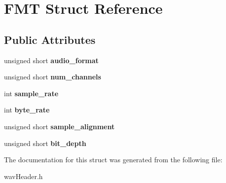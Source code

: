 \hypertarget{structFMT}{}\section{F\+MT Struct Reference}
\label{structFMT}
\subsection*{Public Attributes}
\begin{DoxyCompactItemize}
\item 
\mbox{\label{structFMT_a48bb016d6a5a04fb21e5fa5381117d61}} 
unsigned short {\bfseries audio\+\_\+format}
\item 
\mbox{\label{structFMT_a28919c7db5b63cb70af4dc7f8405599e}} 
unsigned short {\bfseries num\+\_\+channels}
\item 
\mbox{\label{structFMT_ad09f55ae3078ca9c3545204c4b241910}} 
int {\bfseries sample\+\_\+rate}
\item 
\mbox{\label{structFMT_ada872d0d97744d55e35530140ac22003}} 
int {\bfseries byte\+\_\+rate}
\item 
\mbox{\label{structFMT_a59c3f8f2f14ff86b8d10cfbf822f71e9}} 
unsigned short {\bfseries sample\+\_\+alignment}
\item 
\mbox{\label{structFMT_a79e51e1ecd1fbb1de975ea73d07e3193}} 
unsigned short {\bfseries bit\+\_\+depth}
\end{DoxyCompactItemize}


The documentation for this struct was generated from the following file\+:\begin{DoxyCompactItemize}
\item 
wav\+Header.\+h\end{DoxyCompactItemize}
